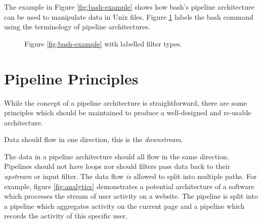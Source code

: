 The example in Figure \ref{fig:bash-example} shows how bash's pipeline architecture can be used to manipulate data in Unix files.
Figure \ref{fig:bash-example-labelled} labels the bash command using the terminology of pipeline architectures.

\begin{figure}[H]
    \centering
{}
\caption{Figure \ref{fig:bash-example} with labelled filter types.}
\label{fig:bash-example-labelled}
\end{figure}

\section{Pipeline Principles}
While the concept of a pipeline architecture is straightforward,
there are some principles which should be maintained to produce a well-designed and re-usable architecture.

\begin{definition}
    Data should flow in one direction, this is the \textsl{downstream}.
\end{definition}

The data in a pipeline architecture should all flow in the same direction.
Pipelines should not have loops nor should filters pass data back to their \textsl{upstream} or input filter.
The data flow \textsl{is} allowed to split into multiple paths.
For example, figure \ref{fig:analytics} demonstrates a potential architecture of a software which processes the stream of user activity on a website.
The pipeline is split into a pipeline which aggregates activity on the current page and a pipeline which records the activity of this specific user.

